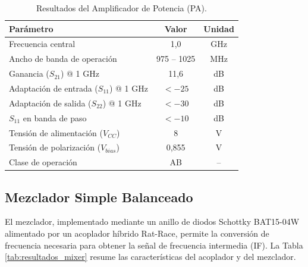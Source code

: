 \begin{table}[htbp]
\centering
\caption{Resultados del Amplificador de Potencia (PA).}
\label{tab:resultados_pa}
\begin{tabular}{@{}lcc@{}}
\toprule
\textbf{Parámetro} & \textbf{Valor} & \textbf{Unidad} \\
\midrule
Frecuencia central & 1,0 & GHz \\
Ancho de banda de operación & 975 -- 1025 & MHz \\
Ganancia ($S_{21}$) @ 1 GHz & 11,6 & dB \\
Adaptación de entrada ($S_{11}$) @ 1 GHz & $< -25$ & dB \\
Adaptación de salida ($S_{22}$) @ 1 GHz & $< -30$ & dB \\
$S_{11}$ en banda de paso & $< -10$ & dB \\
Tensión de alimentación ($V_{CC}$) & 8 & V \\
Tensión de polarización ($V_{bias}$) & 0,855 & V \\
Clase de operación & AB & -- \\
\bottomrule
\end{tabular}
\end{table}

\subsection{Mezclador Simple Balanceado}

El mezclador, implementado mediante un anillo de diodos Schottky BAT15-04W alimentado por un acoplador híbrido Rat-Race, permite la conversión de frecuencia necesaria para obtener la señal de frecuencia intermedia (IF). La Tabla \ref{tab:resultados_mixer} resume las características del acoplador y del mezclador.

